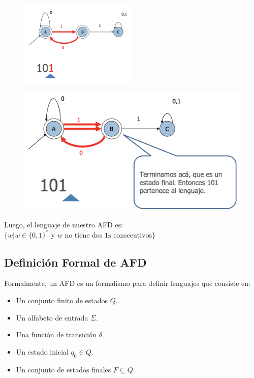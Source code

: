 \documentclass[11pt]{article}
\begin{document}
    \begin{figure}[H]
        \centering
        \includegraphics[width=0.5\textwidth]{img/afd/afd-3}\label{fig:figure3}
    \end{figure}

    \begin{figure}[H]
        \centering
        \includegraphics[width=\textwidth]{img/afd/afd-4}\label{fig:figure4}
    \end{figure}

    Luego, el lenguaje de nuestro AFD es: $\{w | w \in \{0,1\}^{\ast} \text{ y } w \text{ no tiene dos 1s consecutivos}\}$

    \subsection{Definición Formal de AFD}\label{subsec:definicion-formal-de-afd}

    Formalmente, un AFD es un formalismo para definir lenguajes que consiste en:

    \begin{itemize}
        \item Un conjunto finito de estados $Q$.
        \item Un alfabeto de entrada $\Sigma$.
        \item Una función de transición $\delta$.
        \item Un estado inicial $q_0 \in Q$.
        \item Un conjunto de estados finales $F \subseteq Q$.
    \end{itemize}
\end{document}
